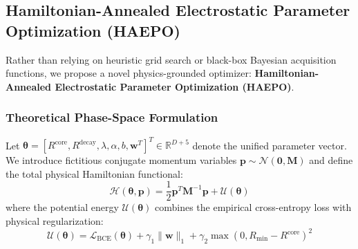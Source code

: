 \documentclass[preprint,review,12pt]{elsarticle}
\begin{document}
\subsection{Hamiltonian-Annealed Electrostatic Parameter Optimization (HAEPO)}
Rather than relying on heuristic grid search or black-box Bayesian acquisition functions, we propose a novel physics-grounded optimizer: \textbf{Hamiltonian-Annealed Electrostatic Parameter Optimization (HAEPO)}.

\subsubsection{Theoretical Phase-Space Formulation}
Let $\boldsymbol{\theta} = [R^{\mathrm{core}}, R^{\mathrm{decay}}, \lambda, \alpha, b, \mathbf{w}^T]^T \in \mathbb{R}^{D+5}$ denote the unified parameter vector. We introduce fictitious conjugate momentum variables $\mathbf{p} \sim \mathcal{N}(\mathbf{0}, \mathbf{M})$ and define the total physical Hamiltonian functional:
\begin{equation}
    \mathcal{H}(\boldsymbol{\theta}, \mathbf{p}) = \frac{1}{2} \mathbf{p}^T \mathbf{M}^{-1} \mathbf{p} + \mathcal{U}(\boldsymbol{\theta})
\end{equation}
where the potential energy $\mathcal{U}(\boldsymbol{\theta})$ combines the empirical cross-entropy loss with physical regularization:
\begin{equation}
    \mathcal{U}(\boldsymbol{\theta}) = \mathcal{L}_{\mathrm{BCE}}(\boldsymbol{\theta}) + \gamma_1 \|\mathbf{w}\|_1 + \gamma_2 \max(0, R_{\min} - R^{\mathrm{core}})^2
\end{equation}
\end{document}
